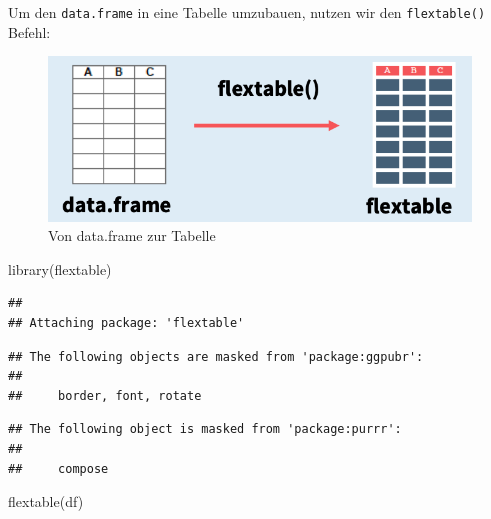 \documentclass[
]{book}
\newenvironment{Shaded}{\begin{snugshade}}{\end{snugshade}}
\newcommand{\FunctionTok}[1]{\textcolor[rgb]{0.00,0.00,0.00}{#1}}
\newcommand{\NormalTok}[1]{#1}
\begin{document}
Um den \texttt{data.frame} in eine Tabelle umzubauen, nutzen wir den \texttt{flextable()} Befehl:

\begin{figure}
\includegraphics[width=9.65in]{images/flextab} \caption{Von data.frame zur Tabelle}\label{fig:unnamed-chunk-191}
\end{figure}

\begin{Shaded}
\begin{Highlighting}[]
\FunctionTok{library}\NormalTok{(flextable)}
\end{Highlighting}
\end{Shaded}

\begin{verbatim}
## 
## Attaching package: 'flextable'
\end{verbatim}

\begin{verbatim}
## The following objects are masked from 'package:ggpubr':
## 
##     border, font, rotate
\end{verbatim}

\begin{verbatim}
## The following object is masked from 'package:purrr':
## 
##     compose
\end{verbatim}

\begin{Shaded}
\begin{Highlighting}[]
\FunctionTok{flextable}\NormalTok{(df)}
\end{Highlighting}
\end{Shaded}

\providecommand{\docline}[3]{\noalign{\global\setlength{\arrayrulewidth}{#1}}\arrayrulecolor[HTML]{#2}\cline{#3}}

\setlength{\tabcolsep}{2pt}

\renewcommand*{\arraystretch}{1.5}
\end{document}
